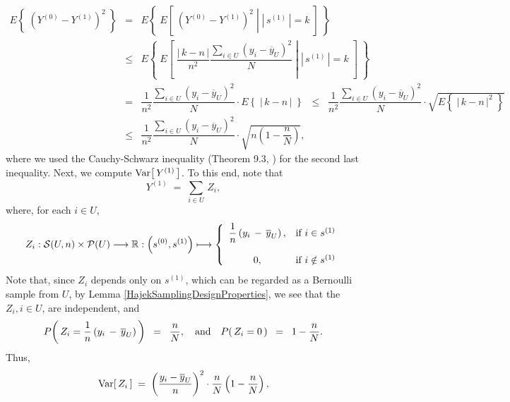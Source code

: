 \begin{eqnarray*}
E\!\left\{\;\left(Y^{(0)} - Y^{(1)}\right)^{2}\;\right\}
&=& E\!\left\{\;E\!\left[\;\left.\left(Y^{(0)} - Y^{(1)}\right)^{2}\;\right\vert\;\left\vert\,s^{(1)}\,\right\vert = k\;\right]\;\right\}
\\
&\leq& E\!\left\{\;E\!\left[\;\left.
\dfrac{\left\vert\,k - n\,\right\vert}{n^{2}}
\dfrac{\underset{i\in U}{\sum}\left(y_{i}-\overline{y}_{U}\right)^{2}}{N}
\;\right\vert\;\left\vert\,s^{(1)}\,\right\vert = k\;\right]\;\right\}
\\
&=&
\dfrac{1}{n^{2}}
\dfrac{\underset{i\in U}{\sum}\left(y_{i}-\overline{y}_{U}\right)^{2}}{N}
\cdot
E\!\left\{\;\left\vert\,k - n\,\right\vert\;\right\}
\;\;\leq\;\;
\dfrac{1}{n^{2}}
\dfrac{\underset{i\in U}{\sum}\left(y_{i}-\overline{y}_{U}\right)^{2}}{N}
\cdot
\sqrt{E\!\left\{\;\left\vert\,k - n\,\right\vert^{2}\;\right\}}
\\
&\leq&
\dfrac{1}{n^{2}}
\dfrac{\underset{i\in U}{\sum}\left(y_{i}-\overline{y}_{U}\right)^{2}}{N}
\cdot
\sqrt{n\left(1 - \dfrac{n}{N}\right)},
\end{eqnarray*}
where we used the Cauchy-Schwarz inequality (Theorem 9.3, \cite{JacodProtter})
for the second last inequality.
Next, we compute $\Var\!\left[\,Y^{(1)}\,\right]$.
To this end, note that
\begin{equation*}
Y^{(1)} \; = \; \sum_{i\in U}\,Z_{i},
\end{equation*}
where, for each $i \in U$,
\begin{equation*}
Z_{i} : \mathcal{S}(U,n) \times \mathcal{P}(U) \longrightarrow \Re :
\left(s^{(0)},s^{(1)}\right) \longmapsto
\left\{\begin{array}{cl}
\dfrac{1}{n}\left(y_{i}\,-\,\overline{y}_{U}\right), & \textnormal{if $i \in s^{(1)}$}
\\ \\
0, & \textnormal{if $i \notin s^{(1)}$}
\end{array}\right.
\end{equation*}
Note that, since $Z_{i}$ depends only on $s^{(1)}$,
which can be regarded as a Bernoulli sample from $U$,
by Lemma \ref{HajekSamplingDesignProperties},
we see that the $Z_{i}, i \in U$, are independent, and
\begin{equation*}
P\!\left(\,Z_{i} = \dfrac{1}{n}\left(y_{i}\,-\,\overline{y}_{U}\right)\,\right) \;\; = \;\; \dfrac{n}{N},
\quad\textnormal{and}\quad
P\!\left(\,Z_{i} = 0\,\right) \;\; = \;\; 1 - \dfrac{n}{N}.
\end{equation*}
Thus,
\begin{equation*}
\Var\!\left[\,Z_{i}\,\right] \; = \; \left(\dfrac{y_{i} - \overline{y}_{U}}{n}\right)^{2}\cdot\dfrac{n}{N}\left(1 - \dfrac{n}{N}\right),
\end{equation*}
